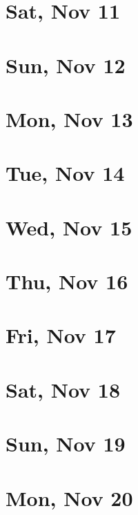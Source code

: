 	\section{Sat, Nov 11}
		
	\section{Sun, Nov 12}
		
	\section{Mon, Nov 13}
		
	\section{Tue, Nov 14}
		
	\section{Wed, Nov 15}
		
	\section{Thu, Nov 16}
		
	\section{Fri, Nov 17}
		
	\section{Sat, Nov 18}
		
	\section{Sun, Nov 19}
		
	\section{Mon, Nov 20}
		
